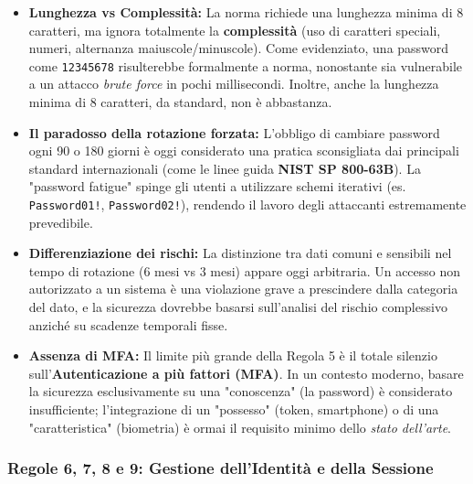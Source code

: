 \begin{itemize}
    \item \textbf{Lunghezza vs Complessità:} La norma richiede una lunghezza minima di 8 caratteri, ma ignora totalmente la \textbf{complessità} (uso di caratteri speciali, numeri, alternanza maiuscole/minuscole). Come evidenziato, una password come \texttt{12345678} risulterebbe formalmente a norma, nonostante sia vulnerabile a un attacco \textit{brute force} in pochi millisecondi. Inoltre, anche la lunghezza minima di 8 caratteri, da standard, non è abbastanza.
    
    \item \textbf{Il paradosso della rotazione forzata:} L'obbligo di cambiare password ogni 90 o 180 giorni è oggi considerato una pratica sconsigliata dai principali standard internazionali (come le linee guida \textbf{NIST SP 800-63B}). La "password fatigue" spinge gli utenti a utilizzare schemi iterativi (es. \texttt{Password01!}, \texttt{Password02!}), rendendo il lavoro degli attaccanti estremamente prevedibile.
    
    \item \textbf{Differenziazione dei rischi:} La distinzione tra dati comuni e sensibili nel tempo di rotazione (6 mesi vs 3 mesi) appare oggi arbitraria. Un accesso non autorizzato a un sistema è una violazione grave a prescindere dalla categoria del dato, e la sicurezza dovrebbe basarsi sull'analisi del rischio complessivo anziché su scadenze temporali fisse.

    \item \textbf{Assenza di MFA:} Il limite più grande della Regola 5 è il totale silenzio sull'\textbf{Autenticazione a più fattori (MFA)}. In un contesto moderno, basare la sicurezza esclusivamente su una "conoscenza" (la password) è considerato insufficiente; l'integrazione di un "possesso" (token, smartphone) o di una "caratteristica" (biometria) è ormai il requisito minimo dello \textit{stato dell'arte}.
\end{itemize}

\subsubsection*{Regole 6, 7, 8 e 9: Gestione dell'Identità e della Sessione}

